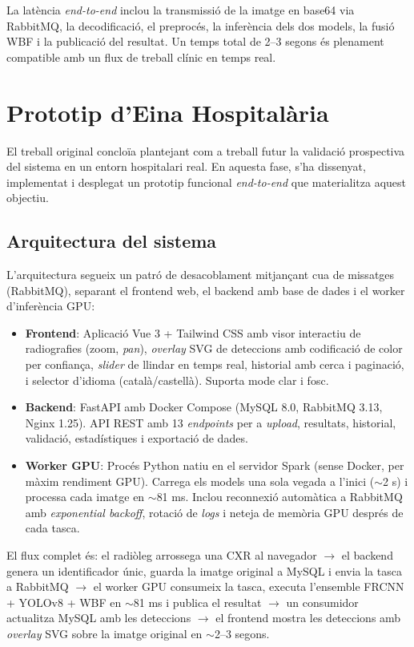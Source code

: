 La latència \textit{end-to-end} inclou la transmissió de la imatge en base64 via RabbitMQ, la decodificació, el preprocés, la inferència dels dos models, la fusió WBF i la publicació del resultat. Un temps total de 2--3 segons és plenament compatible amb un flux de treball clínic en temps real.

\section{Prototip d'Eina Hospitalària}

El treball original concloïa plantejant com a treball futur la validació prospectiva del sistema en un entorn hospitalari real. En aquesta fase, s'ha dissenyat, implementat i desplegat un prototip funcional \textit{end-to-end} que materialitza aquest objectiu.

\subsection{Arquitectura del sistema}

L'arquitectura segueix un patró de desacoblament mitjançant cua de missatges (RabbitMQ), separant el frontend web, el backend amb base de dades i el worker d'inferència GPU:

\begin{itemize}
    \item \textbf{Frontend}: Aplicació Vue 3 + Tailwind CSS amb visor interactiu de radiografies (zoom, \textit{pan}), \textit{overlay} SVG de deteccions amb codificació de color per confiança, \textit{slider} de llindar en temps real, historial amb cerca i paginació, i selector d'idioma (català/castellà). Suporta mode clar i fosc.
    \item \textbf{Backend}: FastAPI amb Docker Compose (MySQL 8.0, RabbitMQ 3.13, Nginx 1.25). API REST amb 13 \textit{endpoints} per a \textit{upload}, resultats, historial, validació, estadístiques i exportació de dades.
    \item \textbf{Worker GPU}: Procés Python natiu en el servidor Spark (sense Docker, per màxim rendiment GPU). Carrega els models una sola vegada a l'inici ($\sim$2 s) i processa cada imatge en $\sim$81 ms. Inclou reconnexió automàtica a RabbitMQ amb \textit{exponential backoff}, rotació de \textit{logs} i neteja de memòria GPU després de cada tasca.
\end{itemize}

El flux complet és: el radiòleg arrossega una CXR al navegador $\rightarrow$ el backend genera un identificador únic, guarda la imatge original a MySQL i envia la tasca a RabbitMQ $\rightarrow$ el worker GPU consumeix la tasca, executa l'ensemble FRCNN + YOLOv8 + WBF en $\sim$81 ms i publica el resultat $\rightarrow$ un consumidor actualitza MySQL amb les deteccions $\rightarrow$ el frontend mostra les deteccions amb \textit{overlay} SVG sobre la imatge original en $\sim$2--3 segons.

